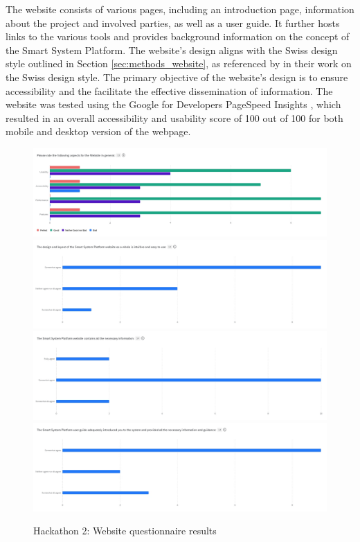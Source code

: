 The website consists of various pages, including an introduction page, information about the project and involved parties, as well as a user guide. It further hosts links to the various tools and provides background information on the concept of the Smart System Platform. The website's design aligns with the Swiss design style outlined in Section \ref{sec:methods_website}, as referenced by \citet{muller-brockmann_grid_2020, hollis_swiss_2006} in their work on the Swiss design style. The primary objective of the website's design is to ensure accessibility and the facilitate the effective dissemination of information. The website was tested using the Google for Developers PageSpeed Insights \citep{noauthor_pagespeed_nodate}, which resulted in an overall accessibility and usability score of 100 out of 100 for both mobile and desktop version of the webpage.

\begin{figure}[H]
    \centering
    \includegraphics[width=\linewidth]{overleaf/images/website_rating.jpg}
    \includegraphics[width=\linewidth]{overleaf/images/website_use.jpg}
    \includegraphics[width=\linewidth]{overleaf/images/website_cvontent.jpg}
    \includegraphics[width=\linewidth]{overleaf/images/user_guide_use.jpg}
    \vspace{\ftspace}
    \caption{Hackathon 2: Website questionnaire results}
    \vspace{\ftspace}
    \label{fig:website_questions}
\end{figure}

